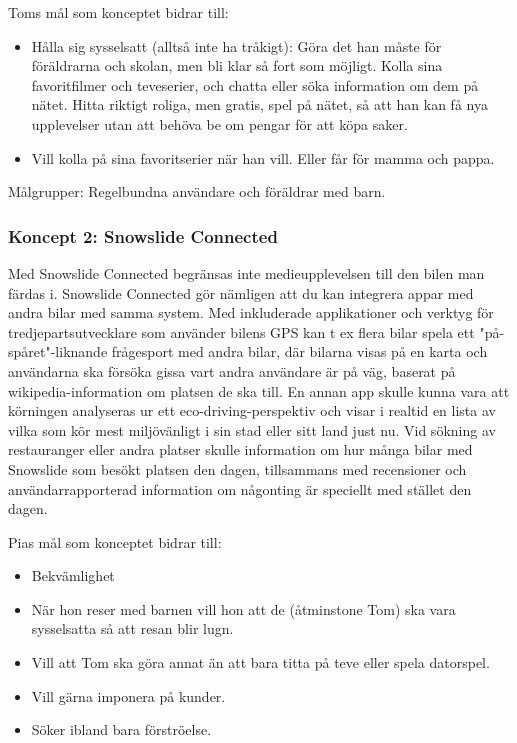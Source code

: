 \documentclass[a4paper,12pt,titlepage]{article}
\begin{document}
Toms mål som konceptet bidrar till:
\begin{itemize}
    \item Hålla sig sysselsatt (alltså inte ha
        tråkigt): Göra det han måste för
        föräldrarna och skolan, men bli klar så
        fort som möjligt. Kolla sina
        favoritfilmer och teveserier, och chatta
        eller söka information om dem på
        nätet. Hitta riktigt roliga, men gratis,
        spel på nätet, så att han kan få nya
        upplevelser utan att behöva be om
        pengar för att köpa saker. 
    \item Vill kolla på sina favoritserier när
        han vill. Eller får för mamma och
        pappa.
\end{itemize}

Målgrupper: Regelbundna användare och föräldrar med barn.

\subsubsection*{Koncept 2: Snowslide Connected}

Med Snowslide Connected begränsas inte medieupplevelsen till den bilen man
färdas i. Snowslide Connected gör nämligen att du kan integrera appar med andra
bilar med samma system. Med inkluderade applikationer och verktyg för
tredjepartsutvecklare som använder bilens GPS kan t ex flera bilar spela 
ett "på-spåret"-liknande
frågesport med andra bilar, där bilarna visas på en karta och användarna ska
försöka gissa vart andra användare är på väg, baserat på wikipedia-information
om platsen de ska till. En annan app skulle kunna vara att körningen analyseras
ur ett eco-driving-perspektiv och visar i realtid en lista av vilka som kör
mest miljövänligt i sin stad eller sitt land just nu. Vid sökning av
restauranger eller andra platser skulle information om hur många bilar med
Snowslide som besökt platsen den dagen, tillsammans med recensioner och
användarrapporterad information om någonting är speciellt med stället den
dagen.

Pias mål som konceptet bidrar till:
\begin{itemize}
    \item Bekvämlighet
    \item När hon reser med barnen vill
        hon att de (åtminstone Tom) ska vara
        sysselsatta så att resan blir lugn.
    \item Vill att Tom ska göra annat än att
        bara titta på teve eller spela datorspel.
    \item Vill gärna imponera på kunder.
    \item Söker ibland bara förströelse.
\end{itemize}
\end{document}
